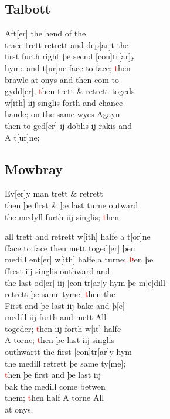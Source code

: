 \documentclass[12pt,letter]{article} %
\newcommand{\red}[1]{\textcolor{red}{#1}}
\newcommand{\srcpg}[1]{
    \noindent{
        \color{Gray}{\rule[0.5ex]{\linewidth}{1pt}~#1} 
    
    }
}
\begin{document}
    \subsection{Talbott}
Aft{[}er{]} the hend of the \\ 
trace trett retrett and dep{[}ar{]}t the \\ 
first furth right þe secnd {[}con{]}tr{[}ar{]}y \\ 
hyme and t{[}ur{]}ne face to face; \red{t}hen \\ 
brawle at onys and then com to-\\ 
gydd{[}er{]}; \red{t}hen trett \& retrett togeds \\ 
w{[}ith{]} iij singlis forth and chance \\
hande; on the same wyes Agayn \\ 
then to ged{[}er{]} ij doblis ij rakis and \\ 
A t{[}ur{]}ne;

    \subsection{Mowbray}
Ev{[}er{]}y man trett \& retrett \\ 
then þe first \& þe last turne outward \\ 
the medyll furth iij singlis; \red{t}hen  
\srcpg{56} 
all trett and retrett w{[}ith{]} halfe a t{[}or{]}ne \\ 
fface to face then mett toged{[}er{]} þen \\
medill ent{[}er{]} w{[}ith{]} halfe a turne; \red{Þ}en þe \\
 ffrest iij singlis outhward and \\
the last od{[}er{]} iij {[}con{]}tr{[}ar{]}y hym þe m{[}e{]}dill \\ 
retrett þe same tyme; \red{t}hen the \\
First and þe last iij bake and þ[e] \\
medill iij furth and mett All \\ 
togeder; \red{t}hen iij forth w{[}it{]} halfe \\ 
A torne; \red{t}hen þe last iij singlis \\ 
outhwartt the first {[}con{]}tr{[}ar{]}y hym \\ 
the medill retrett þe same ty[me]; \\ 
\red{t}hen þe first and þe last iij \\
bak the medill come betwen \\ 
them; \red{t}hen half A torne All \\ at onys.
\end{document}
